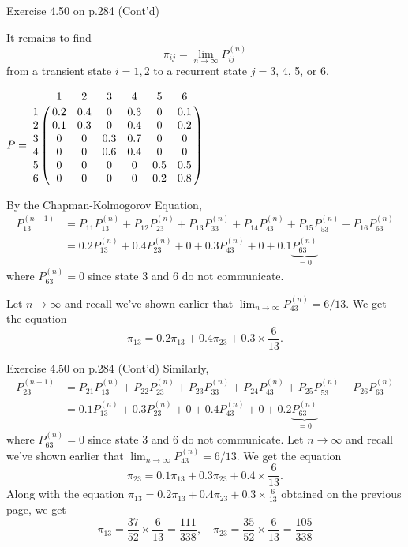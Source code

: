 \documentclass[letterpaper]{beamer}
\begin{document}
\begin{frame}{Exercise 4.50 on p.284 (Cont'd)}
\small
\begin{minipage}{0.4\textwidth}
It remains to find $$\pi_{ij}=\lim_{n\to\infty}P^{(n)}_{ij}$$
from a transient state $i=1,2$ to a recurrent state $j=3$, 4, 5, or 6.%
\end{minipage}\quad
\begin{minipage}{0.55\textwidth}\footnotesize
\begin{flushright}
$P=
\bordermatrix{%
  &  1  &  2  &  3  &  4  &  5  &  6 \cr
1 & 0.2 & 0.4 &  0  & 0.3 &  0  & 0.1\cr
2 & 0.1 & 0.3 &  0  & 0.4 &  0  & 0.2\cr
3 &  0  &  0  & 0.3 & 0.7 &  0  &  0 \cr
4 &  0  &  0  & 0.6 & 0.4 &  0  &  0 \cr
5 &  0  &  0  &  0  &  0  & 0.5 & 0.5\cr
6 &  0  &  0  &  0  &  0  & 0.2 & 0.8
}
$
\end{flushright}
\end{minipage}\par\medskip

By the Chapman-Kolmogorov Equation,
\begin{align*}
P^{(n+1)}_{13}&
=P_{11}P^{(n)}_{13}
+P_{12}P^{(n)}_{23}
+P_{13}P^{(n)}_{33}
+P_{14}P^{(n)}_{43}
+P_{15}P^{(n)}_{53}
+P_{16}P^{(n)}_{63}\\
&=0.2P^{(n)}_{13}+0.4P^{(n)}_{23}+0+0.3P^{(n)}_{43}+0+0.1\underbrace{P^{(n)}_{63}}_{=0}
\end{align*}
where $P^{(n)}_{63}=0$ since state 3 and 6 do not communicate.

Let $n\to \infty$ and recall we've shown earlier that $\lim_{n\to\infty}P^{(n)}_{43}=6/13$.
We get the equation
$$\pi_{13}=0.2\pi_{13}+0.4\pi_{23}+0.3\times\frac{6}{13}.$$
\end{frame}
\begin{frame}{Exercise 4.50 on p.284 (Cont'd)}
Similarly,
\begin{align*}
P^{(n+1)}_{23}&
=P_{21}P^{(n)}_{13}
+P_{22}P^{(n)}_{23}
+P_{23}P^{(n)}_{33}
+P_{24}P^{(n)}_{43}
+P_{25}P^{(n)}_{53}
+P_{26}P^{(n)}_{63}\\
&=0.1P^{(n)}_{13}+0.3P^{(n)}_{23}+0+0.4P^{(n)}_{43}+0+0.2\underbrace{P^{(n)}_{63}}_{=0}
\end{align*}
where $P^{(n)}_{63}=0$ since state 3 and 6 do not communicate.
Let $n\to \infty$ and recall we've shown earlier that $\lim_{n\to\infty}P^{(n)}_{43}=6/13$.
We get the equation
$$\pi_{23}=0.1\pi_{13}+0.3\pi_{23}+0.4\times\frac{6}{13}.$$
Along with the equation $\pi_{13}=0.2\pi_{13}+0.4\pi_{23}+0.3\times\frac{6}{13} $ obtained
on the previous page, we get
$$
\pi_{13}=\frac{37}{52}\times\frac{6}{13}=\frac{111}{338}, \quad\pi_{23}=\frac{35}{52}\times\frac{6}{13}=\frac{105}{338}
$$
\end{frame}
\end{document}
